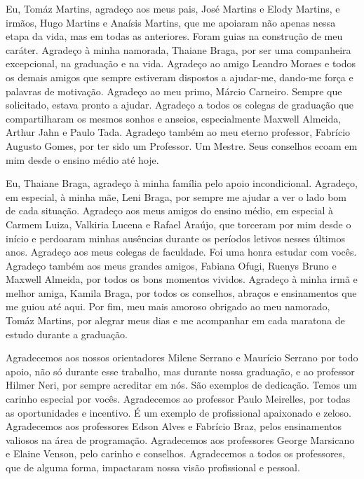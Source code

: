 \begin{agradecimentos}
Eu, Tomáz Martins, agradeço aos meus pais, José Martins e Elody Martins, e irmãos, Hugo Martins e Anaísis Martins, que me apoiaram não apenas nessa etapa da vida, mas em todas as anteriores. Foram guias na construção de meu caráter. Agradeço à minha namorada, Thaiane Braga, por ser uma companheira excepcional, na graduação e na vida. Agradeço ao amigo Leandro Moraes e todos os demais amigos que sempre estiveram dispostos a ajudar-me, dando-me força e palavras de motivação. Agradeço ao meu primo, Márcio Carneiro. Sempre que solicitado, estava pronto a ajudar. Agradeço a todos os colegas de graduação que compartilharam os mesmos sonhos e anseios, especialmente Maxwell Almeida, Arthur Jahn e Paulo Tada. Agradeço também ao meu eterno professor, Fabrício Augusto Gomes, por ter sido um Professor. Um Mestre. Seus conselhos ecoam em mim desde o ensino médio até hoje.

Eu, Thaiane Braga, agradeço à minha família pelo apoio incondicional. Agradeço, em especial, à minha mãe, Leni Braga, por sempre me ajudar a ver o lado bom de cada situação. Agradeço aos meus amigos do ensino médio, em especial à Carmem Luiza, Valkiria Lucena e Rafael Araújo, que torceram por mim desde o início e perdoaram minhas ausências durante os períodos letivos nesses últimos anos. Agradeço aos meus colegas de faculdade. Foi uma honra estudar com vocês. Agradeço também aos meus grandes amigos, Fabiana Ofugi, Ruenys Bruno e Maxwell Almeida, por todos os bons momentos vividos.  Agradeço à minha irmã e melhor amiga, Kamila Braga, por todos os conselhos, abraços e ensinamentos que me guiou até aqui. Por fim, meu mais amoroso obrigado ao meu namorado, Tomáz Martins, por alegrar meus dias e me acompanhar em cada maratona de estudo durante a graduação.

Agradecemos aos nossos orientadores Milene Serrano e Maurício Serrano por todo apoio, não só durante esse trabalho, mas durante nossa graduação, e ao professor Hilmer Neri, por sempre acreditar em nós. São exemplos de dedicação. Temos um carinho especial por vocês. Agradecemos ao professor Paulo Meirelles, por todas as oportunidades e incentivo. É um exemplo de profissional apaixonado e zeloso. Agradecemos aos professores Edson Alves e Fabrício Braz, pelos ensinamentos valiosos na área de programação. Agradecemos aos professores George Marsicano e Elaine Venson, pelo carinho e conselhos. Agradecemos a todos os professores, que de alguma forma, impactaram nossa visão profissional e pessoal. 
\end{agradecimentos}
